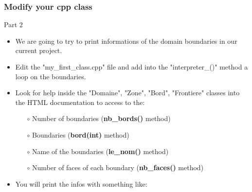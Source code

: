 \documentclass[10pt, hyperref={unicode=true,pdfusetitle, bookmarks=true,bookmarksnumbered=false,bookmarksopen=false, breaklinks=false,pdfborder={0 0 1},backref=true,colorlinks=true,linkcolor=darkblue,pageanchor, urlcolor=darkblue}]{beamer}
\begin{document}
\begin{frame}
\frametitle{Modify your cpp class}
\begin{block}{Part 2}

\begin{itemize}
\item We are going to try to print informations of the domain boundaries in our current project.

\item Edit the "my\_first\_class.cpp" file and add into the "interpreter\_()" method a loop on the boundaries.

\item Look for help inside the "Domaine", "Zone", "Bord", "Frontiere" classes into the HTML documentation to access to the:
    \begin{itemize}
    \item [$\circ$] Number of boundaries (\textbf{nb\_bords()} method)
    \item [$\circ$] Boundaries (\textbf{bord(int)} method)
    \item [$\circ$] Name of the boundaries (\textbf{le\_nom()} method)
    \item [$\circ$] Number of faces of each boundary (\textbf{nb\_faces()} method)
    \end{itemize}

\item You will print the infos with something like:
\begin{center}
\end{center}
\end{itemize}

\end{block}
\end{frame}
\end{document}
